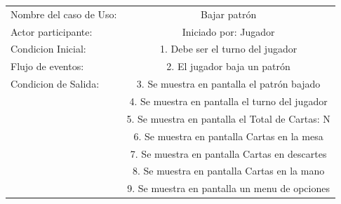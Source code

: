 \documentclass[60pt]{article}
\begin{document}
\begin{center}
    \begin{tabular}{ l | c  }
        
        Nombre del caso de Uso: & Bajar patrón                                    \\
        Actor participante:     & Iniciado por: Jugador                           \\\hline
        Condicion Inicial:      & 1. Debe ser el turno del jugador                \\
        Flujo de eventos:       & 2. El jugador baja un patrón                    \\\hline
        Condicion de Salida:    & 3. Se muestra en pantalla el patrón bajado      \\
                                & 4. Se muestra en pantalla el turno del jugador  \\
                                & 5. Se muestra en pantalla el Total de Cartas: N \\
                                & 6. Se muestra en pantalla Cartas en la mesa     \\
                                & 7. Se muestra en pantalla Cartas en descartes   \\
                                & 8. Se muestra en pantalla Cartas en la mano     \\
                                & 9. Se muestra en pantalla un menu de opciones   \\ 
    \end{tabular} \\
\end{center}
\end{document}
